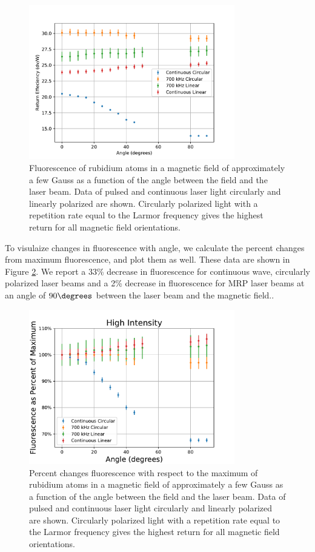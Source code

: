 \documentclass[]{revtex4}
\begin{document}
\begin{figure}[ht]
	\centering
	\includegraphics[width=0.8\textwidth]{../../MRPData/MAR24/together.pdf}
	\caption{Fluorescence of rubidium atoms in a magnetic field of approximately a few Gauss as a function of the angle between the field and the laser beam. Data of pulsed and continuous laser light circularly and linearly polarized are shown. Circularly polarized light with a repetition rate equal to the Larmor frequency gives the highest return for all magnetic field orientations.}
	\label{fig:flvangle}
\end{figure}

To visulaize changes in fluorescence with angle, we calculate the percent changes from maximum fluorescence, and plot them as well. These data are shown in Figure \ref{fig:flvanglescaled}. We report a 33\% decrease in fluorescence for continuous wave, circularly polarized laser beams and a 2\% decrease in fluorescence for MRP laser beams at an angle of $90 \degrees$ between the laser beam and the magnetic field..

\begin{figure}[ht]
	\centering
	\includegraphics[width=0.8\textwidth]{../../MRPData/MAR24/togetherscaled.pdf}
	\caption{Percent changes fluorescence with respect to the maximum of rubidium atoms in a magnetic field of approximately a few Gauss as a function of the angle between the field and the laser beam. Data of pulsed and continuous laser light circularly and linearly polarized are shown. Circularly polarized light with a repetition rate equal to the Larmor frequency gives the highest return for all magnetic field orientations.}
	\label{fig:flvanglescaled}
\end{figure}
\end{document}
